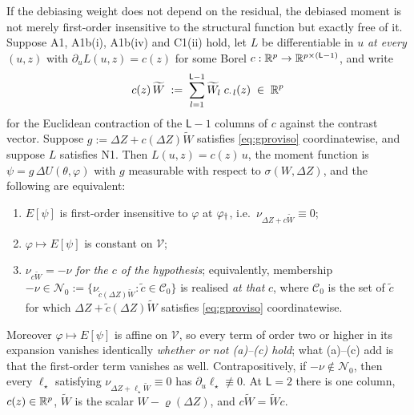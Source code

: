 \begin{corollary}\label{cor:udep}
If the debiasing weight does not depend on the residual, the debiased moment is not merely
first-order insensitive to the structural function but exactly free of it.
Suppose A1, A1b(i), A1b(iv) and C1(ii) hold, let $L$ be differentiable in $u$ \emph{at every} $(u,z)$
with $\partial_uL(u,z)=c(z)$ for some Borel $c:\mathbb{R}^{p}\to\mathbb{R}^{p\times(\mathsf L-1)}$, and write
\[
c(z)\,\widetilde W\;:=\;\sum_{l=1}^{\mathsf L-1}\widetilde W_l\;c_{\cdot\,l}(z)\;\in\;\mathbb{R}^{p}
\]
for the Euclidean contraction of the $\mathsf L-1$ columns of $c$ against the contrast vector. Suppose
$g:=\Delta Z+c(\Delta Z)\widetilde W$ satisfies \eqref{eq:gproviso} coordinatewise, and suppose $L$
satisfies N1. Then
$L(u,z)=c(z)\,u$, the moment function is $\psi=g\,\Delta U(\theta,\varphi)$ with $g$ measurable with
respect to $\sigma(W,\Delta Z)$, and the following are equivalent:
\begin{enumerate}
\item[(a)] $E[\psi]$ is first-order insensitive to $\varphi$ at $\varphi_{\dagger}$, i.e.\
$\nu_{\Delta Z+c\widetilde W}\equiv0$;
\item[(b)] $\varphi\mapsto E[\psi]$ is constant on $\mathcal V$;
\item[(c)] $\nu_{c\widetilde W}=-\nu$ \emph{for the $c$ of the hypothesis}; equivalently, membership
$-\nu\in\mathcal N_0:=\{\nu_{\tilde c(\Delta Z)\widetilde W}:\tilde c\in\mathcal C_0\}$ is realised
\emph{at that} $c$, where $\mathcal C_0$ is the set of $\tilde c$ for which
$\Delta Z+\tilde c(\Delta Z)\widetilde W$ satisfies \eqref{eq:gproviso} coordinatewise.
\end{enumerate}
Moreover $\varphi\mapsto E[\psi]$ is affine on $\mathcal V$, so every term of order two or higher in its
expansion vanishes identically \emph{whether or not \textup{(a)--(c)} hold}; what \textup{(a)--(c)} add is
that the first-order term vanishes as well. Contrapositively, if $-\nu\notin\mathcal N_0$, then every
$\ell_\star$ satisfying $\nu_{\Delta Z+\ell_\star\widetilde W}\equiv0$ has
$\partial_u\ell_\star\not\equiv0$.
At $\mathsf L=2$ there is one column, $c(z)\in\mathbb{R}^{p}$, $\widetilde W$ is the scalar
$W-\varrho(\Delta Z)$, and $c\widetilde W=\widetilde Wc$.
\end{corollary}

